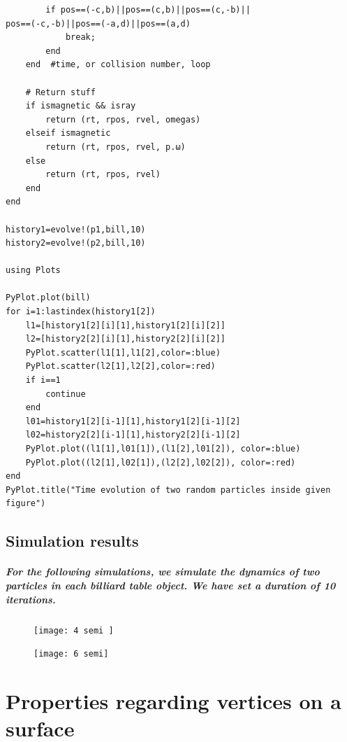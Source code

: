 \documentclass{report}
\begin{document}
\begin{lstlisting}
        if pos==(-c,b)||pos==(c,b)||pos==(c,-b)||
pos==(-c,-b)||pos==(-a,d)||pos==(a,d)
            break;
        end
    end  #time, or collision number, loop

    # Return stuff
    if ismagnetic && isray
        return (rt, rpos, rvel, omegas)
    elseif ismagnetic
        return (rt, rpos, rvel, p.ω)
    else
        return (rt, rpos, rvel)
    end
end

history1=evolve!(p1,bill,10)
history2=evolve!(p2,bill,10)

using Plots

PyPlot.plot(bill)
for i=1:lastindex(history1[2])
    l1=[history1[2][i][1],history1[2][i][2]]
    l2=[history2[2][i][1],history2[2][i][2]]
    PyPlot.scatter(l1[1],l1[2],color=:blue)
    PyPlot.scatter(l2[1],l2[2],color=:red)
    if i==1
        continue
    end
    l01=history1[2][i-1][1],history1[2][i-1][2]
    l02=history2[2][i-1][1],history2[2][i-1][2]
    PyPlot.plot((l1[1],l01[1]),(l1[2],l01[2]), color=:blue)
    PyPlot.plot((l2[1],l02[1]),(l2[2],l02[2]), color=:red)
end
PyPlot.title("Time evolution of two random particles inside given figure")
\end{lstlisting}


\section{Simulation results}

\paragraph{For the following simulations, we simulate the dynamics of two particles in each billiard table object. We have set a duration of 10 iterations.}

\begin{figure}[h] 
\begin{center}
\texttt{[image: 4 semi ]}
\caption{
}
\end{center}
\end{figure}



\begin{figure}[h] 
\begin{center}
\texttt{[image: 6 semi]}
\caption{
}
\end{center}
\end{figure}



\appendix

\chapter{Properties regarding vertices on a surface}
\end{document}
